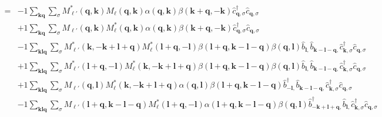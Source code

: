 \begin{align*}
	[\eta (\ell), \eta (\ell')] = 	&-1 \sum_{ \mathbf{k} \mathbf{q} } \sum_{ \sigma } M_{\ell'}^*( \mathbf{q}, \mathbf{k} )  M_{\ell}( \mathbf{q}, \mathbf{k} )  \alpha( \mathbf{q}, \mathbf{k} )  \beta( \mathbf{k}+\mathbf{q}, -\mathbf{k} )   \hat{c}_{ \mathbf{q}, \sigma }^\dagger  \hat{c}_{ \mathbf{q}, \sigma }^{\phantom{\dagger}}  \\
	&+1 \sum_{ \mathbf{k} \mathbf{q} } \sum_{ \sigma } M_{\ell'}( \mathbf{q}, \mathbf{k} )  M_{\ell}^*( \mathbf{q}, \mathbf{k} )  \alpha( \mathbf{q}, \mathbf{k} )  \beta( \mathbf{k}+\mathbf{q}, -\mathbf{k} )   \hat{c}_{ \mathbf{q}, \sigma }^\dagger  \hat{c}_{ \mathbf{q}, \sigma }^{\phantom{\dagger}}  \\
	&-1 \sum_{ \mathbf{k} \mathbf{l} \mathbf{q} } \sum_{ \sigma } M_{\ell'}^*( \mathbf{k}, -\mathbf{k}+\mathbf{l}+\mathbf{q} )  M_{\ell}^*( \mathbf{l}+\mathbf{q}, -\mathbf{l} )  \beta( \mathbf{l}+\mathbf{q}, \mathbf{k}-\mathbf{l}-\mathbf{q} )  \beta( \mathbf{q}, \mathbf{l} )   \hat{b}_{ \mathbf{l}, }^{\phantom{\dagger}} \hat{b}_{ \mathbf{k}-\mathbf{l}-\mathbf{q}, }^{\phantom{\dagger}} \hat{c}_{ \mathbf{k}, \sigma }^\dagger  \hat{c}_{ \mathbf{q}, \sigma }^{\phantom{\dagger}}  \\
	&+1 \sum_{ \mathbf{k} \mathbf{l} \mathbf{q} } \sum_{ \sigma } M_{\ell'}^*( \mathbf{l}+\mathbf{q}, -\mathbf{l} )  M_{\ell}^*( \mathbf{k}, -\mathbf{k}+\mathbf{l}+\mathbf{q} )  \beta( \mathbf{l}+\mathbf{q}, \mathbf{k}-\mathbf{l}-\mathbf{q} )  \beta( \mathbf{q}, \mathbf{l} )   \hat{b}_{ \mathbf{l}, }^{\phantom{\dagger}} \hat{b}_{ \mathbf{k}-\mathbf{l}-\mathbf{q}, }^{\phantom{\dagger}} \hat{c}_{ \mathbf{k}, \sigma }^\dagger  \hat{c}_{ \mathbf{q}, \sigma }^{\phantom{\dagger}}  \\
	&+1 \sum_{ \mathbf{k} \mathbf{l} \mathbf{q} } \sum_{ \sigma } M_{\ell'}( \mathbf{q}, \mathbf{l} )  M_{\ell}^*( \mathbf{k}, -\mathbf{k}+\mathbf{l}+\mathbf{q} )  \alpha( \mathbf{q}, \mathbf{l} )  \beta( \mathbf{l}+\mathbf{q}, \mathbf{k}-\mathbf{l}-\mathbf{q} )   \hat{b}_{ -\mathbf{l}, }^\dagger  \hat{b}_{ \mathbf{k}-\mathbf{l}-\mathbf{q}, }^{\phantom{\dagger}} \hat{c}_{ \mathbf{k}, \sigma }^\dagger  \hat{c}_{ \mathbf{q}, \sigma }^{\phantom{\dagger}}  \\
	&-1 \sum_{ \mathbf{k} \mathbf{l} \mathbf{q} } \sum_{ \sigma } M_{\ell'}( \mathbf{l}+\mathbf{q}, \mathbf{k}-\mathbf{l}-\mathbf{q} )  M_{\ell}^*( \mathbf{l}+\mathbf{q}, -\mathbf{l} )  \alpha( \mathbf{l}+\mathbf{q}, \mathbf{k}-\mathbf{l}-\mathbf{q} )  \beta( \mathbf{q}, \mathbf{l} )   \hat{b}_{ -\mathbf{k}+\mathbf{l}+\mathbf{q}, }^\dagger  \hat{b}_{ \mathbf{l}, }^{\phantom{\dagger}} \hat{c}_{ \mathbf{k}, \sigma }^\dagger  \hat{c}_{ \mathbf{q}, \sigma }^{\phantom{\dagger}}  \\

\end{align*}
